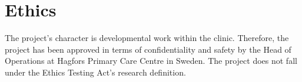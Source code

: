 \documentclass[12pt,a4paper,oneside]{article}
\let\oldcite\cite
\renewcommand*\cite[1]{\textsuperscript{\oldcite{#1}}}
\begin{document}


\section*{Ethics}
The project's character is developmental work within the clinic. 
Therefore, the project has been approved in terms of confidentiality and safety by the Head of Operations at Hagfors Primary Care Centre in Sweden. The project does not fall under the Ethics Testing Act's research definition.
\end{document}
